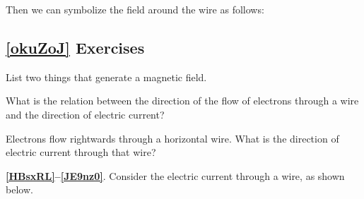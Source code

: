 \documentclass{article}
\numberwithin{equation}{section}
\numberwithin{figure}{section}
\begin{document}
\clearpage

Then we can symbolize the field around the wire as follows:

\begin{center}
\captionsetup{type=figure,margin=1in}
\end{center}

\subsection*{\ref{okuZoJ} Exercises}

\begin{exercise}
    List two things that generate a magnetic field.
\end{exercise}

\begin{exercise}
    What is the relation between the direction of the flow of electrons through a wire and the direction of electric current?
\end{exercise}

\begin{exercise}
    Electrons flow rightwards through a horizontal wire. What is the direction of electric current through that wire?
\end{exercise}

\cyanhrule 

\vspace{1em}

\textbf{\ref{HBsxRL}--\ref{JE9nz0}}. Consider the electric current through a wire, as shown below.

\begin{center}
\end{center}
\end{document}
